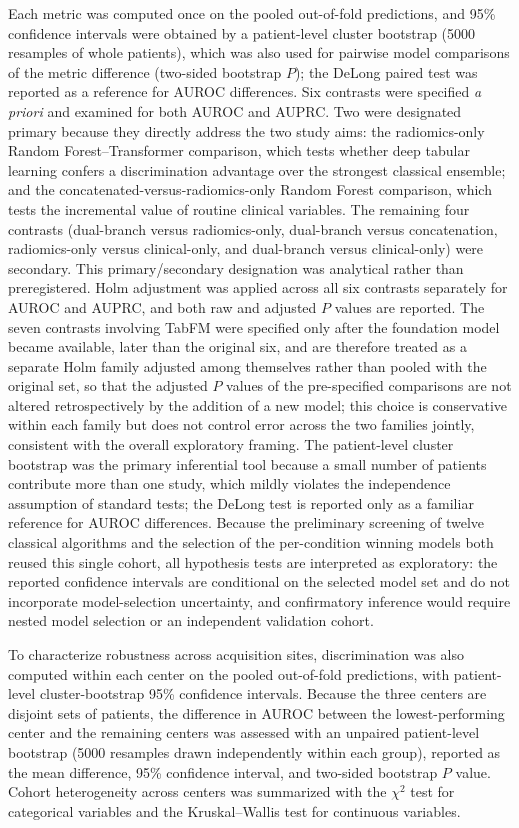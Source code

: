 \documentclass[11pt]{article}
\begin{document}
Each metric was computed once on the pooled out-of-fold predictions, and 95\%
confidence intervals were obtained by a patient-level cluster bootstrap (5000
resamples of whole patients), which was also used for pairwise model comparisons
of the metric difference (two-sided bootstrap $P$); the DeLong paired test was
reported as a reference for AUROC differences. Six contrasts were specified
\emph{a priori} and examined for both AUROC and AUPRC. Two were designated
primary because they directly address the two study aims: the radiomics-only
Random Forest--Transformer comparison, which tests whether deep tabular learning
confers a discrimination advantage over the strongest classical ensemble; and
the concatenated-versus-radiomics-only Random Forest comparison, which tests the
incremental value of routine clinical variables. The remaining four contrasts
(dual-branch versus radiomics-only, dual-branch versus concatenation,
radiomics-only versus clinical-only, and dual-branch versus clinical-only) were
secondary. This primary/secondary designation was analytical rather than
preregistered. Holm adjustment was applied across all six contrasts separately
for AUROC and AUPRC, and both raw and adjusted $P$ values are reported. The
seven contrasts involving TabFM were specified only after the foundation model
became available, later than the original six, and are therefore treated as a
separate Holm family adjusted among themselves rather than pooled with the
original set, so that the adjusted $P$ values of the pre-specified comparisons
are not altered retrospectively by the addition of a new model; this choice is
conservative within each family but does not control error across the two
families jointly, consistent with the overall exploratory framing. The
patient-level cluster bootstrap was the primary inferential tool because a small
number of patients contribute more than one study, which mildly violates the
independence assumption of standard tests; the DeLong test is reported only as a
familiar reference for AUROC differences. Because the preliminary screening of
twelve classical algorithms and the selection of the per-condition winning models
both reused this single cohort, all hypothesis tests are interpreted as
exploratory: the reported confidence intervals are conditional on the selected
model set and do not incorporate model-selection uncertainty, and confirmatory
inference would require nested model selection or an independent validation cohort.

To characterize robustness across acquisition sites, discrimination was also
computed within each center on the pooled out-of-fold predictions, with
patient-level cluster-bootstrap 95\% confidence intervals. Because the three
centers are disjoint sets of patients, the difference in AUROC between the
lowest-performing center and the remaining centers was assessed with an unpaired
patient-level bootstrap (5000 resamples drawn independently within each group),
reported as the mean difference, 95\% confidence interval, and two-sided
bootstrap $P$ value. Cohort heterogeneity across centers was summarized with the
$\chi^2$ test for categorical variables and the Kruskal--Wallis test for
continuous variables.
\end{document}
